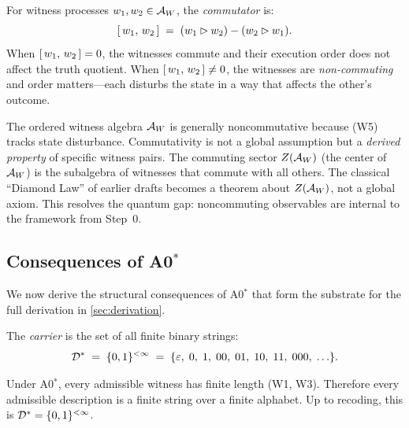 \begin{definition}
\label{def:witness-commutator}
For witness processes $w_1, w_2 \in \mathcal{A}_W$, the \emph{commutator} is:
\[
  [\,w_1,\,w_2\,] \;=\;
  (w_1 \mathbin{\vartriangleright} w_2) - (w_2 \mathbin{\vartriangleright} w_1).
\]
When $[\,w_1,\,w_2\,] = 0$, the witnesses commute and their
execution order does not affect the truth quotient.  When
$[\,w_1,\,w_2\,] \neq 0$, the witnesses are \emph{non-commuting}
and order matters---each disturbs the state in a way that affects the
other's outcome.
\end{definition}

\begin{remark}
\label{rem:noncommutativity}
The ordered witness algebra $\mathcal{A}_W$ is generally noncommutative because
(W5) tracks state disturbance.  Commutativity is not a global assumption
but a \emph{derived property} of specific witness pairs.  The commuting
sector $Z(\mathcal{A}_W)$ (the center of $\mathcal{A}_W$) is the subalgebra of witnesses
that commute with all others.  The classical ``Diamond Law'' of earlier
drafts becomes a theorem about $Z(\mathcal{A}_W)$, not a global axiom.  This
resolves the quantum gap: noncommuting observables are internal to the
framework from Step~0.
\end{remark}

\subsection{Consequences of A0$^*$}
\label{sec:axioms:consequences}

We now derive the structural consequences of A0$^*$ that form the substrate
for the full derivation in \cref{sec:derivation}.

\begin{definition}
\label{def:carrier}
The \emph{carrier} is the set of all finite binary strings:
\[
  \mathcal{D}^* \;=\; \{0,1\}^{<\infty}
    \;=\; \{\varepsilon,\; 0,\; 1,\; 00,\; 01,\; 10,\; 11,\; 000,\; \ldots\}.
\]
\end{definition}

\begin{proposition}
\label{prop:carrier-forced}
Under A0$^*$, every admissible witness has finite length (W1, W3).
Therefore every admissible description is a finite string over a finite
alphabet.  Up to recoding, this is $\mathcal{D}^* = \{0,1\}^{<\infty}$.

\end{proposition}

